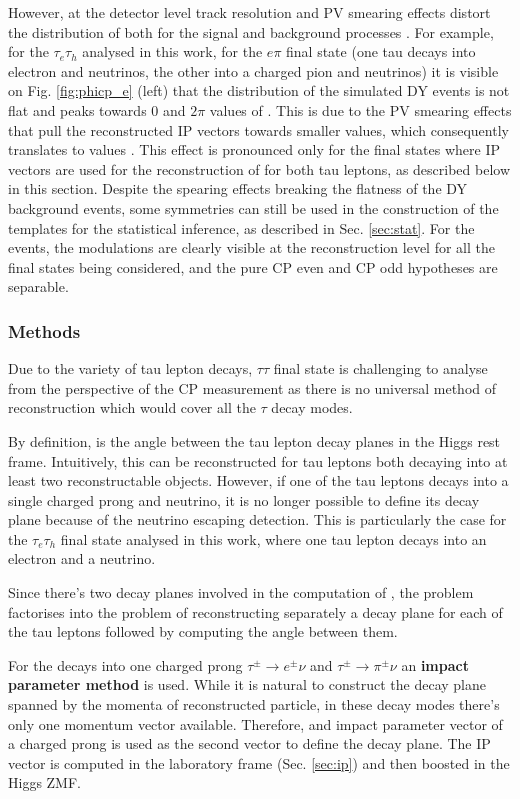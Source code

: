 However, at the detector level track resolution and PV smearing effects distort the distribution of \phicp both for the signal and background processes \cite{Berge:2014sra}. For example, for the $\tau_e\tau_h$ analysed in this work, for the $e\pi$ final state (one tau decays into electron and neutrinos, the other into a charged pion and neutrinos) it is visible on Fig. \ref{fig:phicp_e} (left) that the distribution of the simulated DY events is not flat and peaks towards $0$ and $2\pi$ values of \phicp. This is due to the PV smearing effects that pull the reconstructed IP vectors towards smaller values, which consequently translates to \phicp values . This effect is pronounced only for the final states where IP vectors are used for the reconstruction of \phicp for both tau leptons, as described below in this section. Despite the spearing effects breaking the flatness of the DY background events, some symmetries can still be used in the construction of the templates for the statistical inference, as described in Sec. \ref{sec:stat}. For the \htt events, the modulations are clearly visible at the reconstruction level for all the final states being considered, and the pure CP even and CP odd hypotheses are separable. 

\subsubsection{Methods}
Due to the variety of tau lepton decays, $\tau\tau$ final state is challenging to analyse from the perspective of the CP measurement as there is no universal method of \phicp reconstruction which would cover all the $\tau$ decay modes. 

By definition, \phicp is the angle between the tau lepton decay planes in the Higgs rest frame. Intuitively, this can be reconstructed for tau leptons both decaying into at least two reconstructable objects. However, if one of the tau leptons decays into a single charged prong and neutrino, it is no longer possible to define its decay plane because of the neutrino escaping detection. This is particularly the case for the $\tau_e\tau_h$ final state analysed in this work, where one tau lepton decays into an electron and a neutrino.

Since there's two decay planes involved in the computation of \phicp, the problem factorises into the problem of reconstructing separately a decay plane for each of the tau leptons followed by computing the angle between them. 

For the decays into one charged prong $\tau^\pm \to e^\pm \nu$ and $\tau^\pm \to \pi^\pm \nu$ an \textbf{impact parameter method} is used. While it is natural to construct the decay plane spanned by the momenta of reconstructed particle, in these decay modes there's only one momentum vector available. Therefore, and impact parameter vector of a charged prong is used as the second vector to define the decay plane. The IP vector is computed in the laboratory frame (Sec. \ref{sec:ip}) and then boosted in the Higgs ZMF. 


